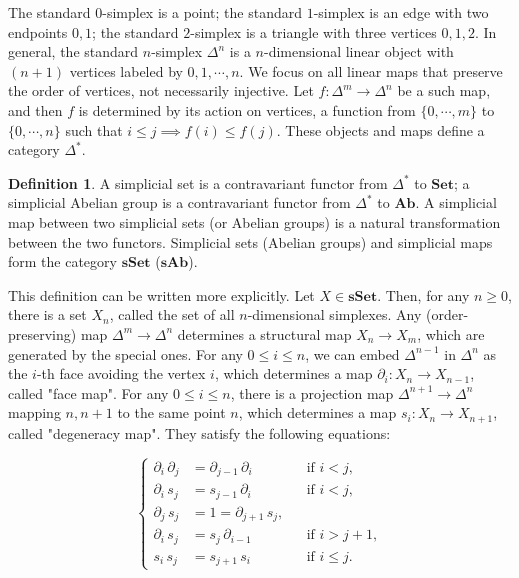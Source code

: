 \documentclass[reprint, amsmath, amssymb, showpacs, floatfix, longbibliography, aps, twocolumn, superscriptaddress, nofootinbib]{revtex4-2}
\theoremstyle{definition}
\newtheorem{definition}{Definition}[section]
\begin{document}
The standard $0$-simplex is a point; the standard $1$-simplex is an edge with two endpoints $0,1$; the standard $2$-simplex is a triangle with three vertices $0,1,2$. In general, the standard $n$-simplex $\Delta^n$ is a $n$-dimensional linear object with $(n+1)$ vertices labeled by $0,1,\cdots,n$. We focus on all linear maps that preserve the order of vertices, not necessarily injective. Let $f:\Delta^m\rightarrow \Delta^n$ be a such map, and then $f$ is determined by its action on vertices, a function from $\{0,\cdots,m\}$ to $\{0,\cdots,n\}$ such that $i\le j\implies f(i)\le f(j)$. These objects and maps define a category $\Delta^*$.

\begin{definition}
	A simplicial set is a contravariant functor from $\Delta^*$ to $\mathbf{Set}$; a simplicial Abelian group is a contravariant functor from $\Delta^*$ to $\mathbf{Ab}$. A simplicial map between two simplicial sets (or Abelian groups) is a natural transformation between the two functors. Simplicial sets (Abelian groups) and simplicial maps form the category $\mathbf{sSet}$ ($\mathbf{sAb}$). 
\end{definition}




This definition can be written more explicitly. Let  $X\in \mathbf{sSet}$. Then, for any $n\ge0$, there is a set $X_n$, called the set of all $n$-dimensional simplexes. Any (order-preserving) map $\Delta^m\rightarrow \Delta^n$ determines a structural map $X_n\rightarrow X_m$, which are generated by the special ones. For any $0\le i\le n$, we can embed $\Delta^{n-1}$ in $\Delta^n$ as the $i$-th face avoiding the vertex $i$, which determines a map $\partial_i:X_n\rightarrow X_{n-1}$, called "face map". For any $0\le i\le n$, there is a projection map $\Delta^{n+1}\rightarrow \Delta^n$ mapping $n,n+1$ to the same point $n$, which determines a map $s_i:X_n\rightarrow X_{n+1}$, called "degeneracy map". They satisfy the following equations:

\begin{equation}\label{eqSimplicialIdentity}
	\left\{
	\begin{aligned}
		\partial_i\,\partial_j &= \partial_{j-1}\,\partial_i && \text{if } i<j,\\
		\partial_i\, s_j &= s_{j-1}\, \partial_i && \text{if } i<j,\\
		\partial_j\, s_j &= 1 = \partial_{j+1}\, s_j,\\
		\partial_i\, s_j &= s_j\, \partial_{i-1} && \text{if } i>j+1,\\
		s_i\, s_j &= s_{j+1}\, s_i && \text{if } i\le j.
	\end{aligned}
	\right.
\end{equation}
\end{document}
